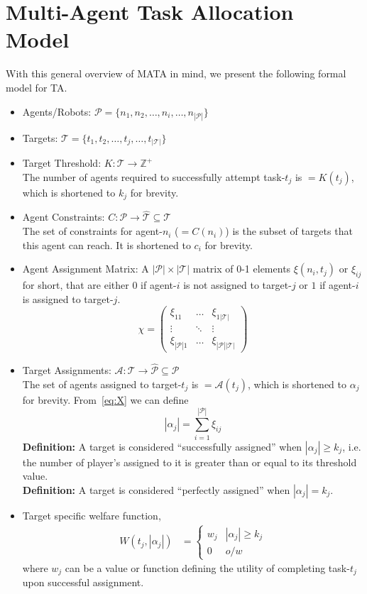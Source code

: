 \documentclass[12pt]{book}
\newcommand{\Pl}{\mathcal{P}} %
\newcommand{\Ta}{\mathcal{T}} %
\begin{document}
\section{Multi-Agent Task Allocation Model}
With this general overview of MATA in mind, we present the following formal model for TA.
\begin{itemize}
	\item Agents/Robots: $\Pl = \{n_1, n_2, \ldots, n_i, \ldots,n_{|\Pl|}\}$
	\item Targets: $\Ta = \{t_1, t_2, \ldots, t_j, \ldots,t_{|\Ta|}\}$
	\item Target Threshold: $K:\Ta \to \mathbb{Z}^+$\\
	The number of agents required to successfully attempt task-$t_j$ is $= K(t_j)$, which is shortened to $k_j$ for brevity.
	
	\item Agent Constraints: $C:\Pl \to \hat{\Ta} \subseteq \Ta$\\
	The set of constraints for agent-$n_i$ ($= C(n_i)$) is the subset of targets that this agent can reach. It is shortened to $c_i$ for brevity.
	\item Agent Assignment Matrix: A $|\Pl| \times |\Ta|$ matrix of 0-1 elements $\xi(n_i, t_j)$ or $\xi_{ij}$ for short, that are either $0$ if agent-$i$ is not assigned to target-$j$ or $1$ if agent-$i$ is assigned to target-$j$.
	\begin{equation}\label{eq:X}
		\chi = \left(\begin{array}{ccc}
			\xi_{11} & \ldots & \xi_{1|\Ta|}\\
			\vdots & \ddots & \vdots\\
			\xi_{|\Pl|1} & \ldots & \xi_{|\Pl||\Ta|}
		\end{array}\right)
	\end{equation}
	\item Target Assignments: $\mathcal{A}:\Ta \to \hat{\Pl} \subseteq \Pl$\\
	The set of agents assigned to target-$t_j$ is $= \mathcal{A}(t_j)$, which is shortened to $\alpha_j$ for brevity. From~\eqref{eq:X} we can define
\begin{equation}\label{eq:aj}
	|\alpha_j| = \sum\limits_{i = 1}^{|\Pl|} \xi_{ij}
\end{equation}
	\textbf{Definition:} A target is considered ``successfully assigned'' when $|\alpha_j| \geq k_j$, i.e. the number of player's assigned to it is greater than or equal to its threshold value.\\
	\textbf{Definition:} A target is considered ``perfectly assigned'' when $|\alpha_j| = k_j$.
	\item Target specific welfare function,
\begin{align}\label{eq:wf}
	W(t_j, |\alpha_j|) & = \left\{
	\begin{array}{ll}
		w_j & |\alpha_j| \geq k_j\\
		0 & o/w
	\end{array}\right.
\end{align}
where $w_j$ can be a value or function defining the utility of completing task-$t_j$ upon successful assignment.


\end{itemize}
\end{document}
